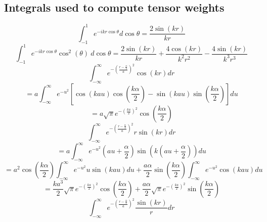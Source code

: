 \documentclass[letterpaper,twocolumn,amsmath,amssymb,prb]{revtex4-1}
\begin{document}
\begin{widetext}
\[{}\]
\subsection{Integrals used to compute tensor weights}
\begin{equation}{\int_{-1}^{1}{e^{-ikr\cos{\theta}}d{\cos{\theta}}}=\frac{2\sin(kr)}{kr}}\end{equation} 
\[{}\]
\begin{equation}{\int_{-1}^{1}{e^{-ikr\cos{\theta}}\cos^2(\theta)~d{\cos{\theta}}}=\frac{2\sin(kr)}{kr}+\frac{4\cos(kr)}{k^2r^2}-\frac{4\sin(kr)}{k^3r^3}}\end{equation} 
\[{}\]
\[{}\]
\begin{equation}{\int_{-\infty}^{\infty}{e^{-\left(\frac{r-\frac{\alpha}{2}}{a}\right)^2}\cos(kr)d{r}}}\end{equation}
\begin{displaymath}{=a\int_{-\infty}^{\infty}{e^{-u^2}\left[\cos(kau)\cos(\frac{k\alpha}{2})-\sin(kau)\sin(\frac{k\alpha}{2})\right]d{u}}}\end{displaymath}  
\begin{equation}{=a\sqrt{\pi}e^{-\left(\frac{ka}{2}\right)^2}\cos(\frac{k\alpha}{2})}\end{equation} 
\[{}\]
\begin{equation}{\int_{-\infty}^{\infty}{e^{-\left(\frac{r-\frac{\alpha}{2}}{a}\right)^2}r\sin(kr)d{r}}}\end{equation} 
\begin{displaymath}{=a\int_{-\infty}^{\infty}{e^{-u^2}(au+\frac{\alpha}{2})\sin(k(au+\frac{\alpha}{2}))d{u}}}\end{displaymath} 
\begin{displaymath}{=a^2\cos(\frac{k\alpha}{2})\int_{-\infty}^{\infty}{e^{-u^2}u\sin(kau)d{u} +\frac{a\alpha}{2}\sin(\frac{k\alpha}{2})\int_{-\infty}^{\infty}e^{-u^2}\cos(kau)d{u}}}\end{displaymath} 
\begin{equation}{=\frac{ka^3}{2}\sqrt{\pi}e^{-\left(\frac{ka}{2}\right)^2}\cos(\frac{k\alpha}{2})+\frac{a\alpha}{2}\sqrt{\pi}e^{-\left(\frac{ka}{2}\right)^2}\sin(\frac{k\alpha}{2})}\end{equation} 
\[{}\]
\begin{equation}{\int_{-\infty}^{\infty}{e^{-\left(\frac{r-\frac{\alpha}{2}}{a}\right)^2}\frac{\sin(kr)}{r}d{r}}}\end{equation} 

\end{widetext}
\end{document}
